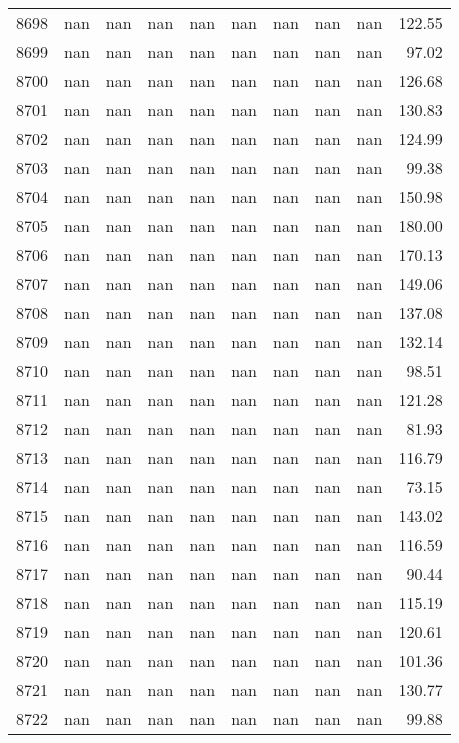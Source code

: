 \begin{tabular}{lrrrrrrrrr}
8698 & nan & nan & nan & nan & nan & nan & nan & nan & 122.55 \\
8699 & nan & nan & nan & nan & nan & nan & nan & nan & 97.02 \\
8700 & nan & nan & nan & nan & nan & nan & nan & nan & 126.68 \\
8701 & nan & nan & nan & nan & nan & nan & nan & nan & 130.83 \\
8702 & nan & nan & nan & nan & nan & nan & nan & nan & 124.99 \\
8703 & nan & nan & nan & nan & nan & nan & nan & nan & 99.38 \\
8704 & nan & nan & nan & nan & nan & nan & nan & nan & 150.98 \\
8705 & nan & nan & nan & nan & nan & nan & nan & nan & 180.00 \\
8706 & nan & nan & nan & nan & nan & nan & nan & nan & 170.13 \\
8707 & nan & nan & nan & nan & nan & nan & nan & nan & 149.06 \\
8708 & nan & nan & nan & nan & nan & nan & nan & nan & 137.08 \\
8709 & nan & nan & nan & nan & nan & nan & nan & nan & 132.14 \\
8710 & nan & nan & nan & nan & nan & nan & nan & nan & 98.51 \\
8711 & nan & nan & nan & nan & nan & nan & nan & nan & 121.28 \\
8712 & nan & nan & nan & nan & nan & nan & nan & nan & 81.93 \\
8713 & nan & nan & nan & nan & nan & nan & nan & nan & 116.79 \\
8714 & nan & nan & nan & nan & nan & nan & nan & nan & 73.15 \\
8715 & nan & nan & nan & nan & nan & nan & nan & nan & 143.02 \\
8716 & nan & nan & nan & nan & nan & nan & nan & nan & 116.59 \\
8717 & nan & nan & nan & nan & nan & nan & nan & nan & 90.44 \\
8718 & nan & nan & nan & nan & nan & nan & nan & nan & 115.19 \\
8719 & nan & nan & nan & nan & nan & nan & nan & nan & 120.61 \\
8720 & nan & nan & nan & nan & nan & nan & nan & nan & 101.36 \\
8721 & nan & nan & nan & nan & nan & nan & nan & nan & 130.77 \\
8722 & nan & nan & nan & nan & nan & nan & nan & nan & 99.88 \\

\end{tabular}
